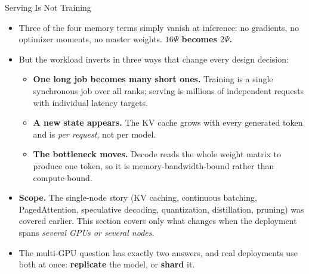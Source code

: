 \begin{frame}{Serving Is Not Training}
  \begin{itemize}\itemsep0.35em
    \item[\textcolor{red}{$\blacktriangleright$}] Three of the four memory terms simply vanish at inference: no gradients, no optimizer moments, no master weights. \textbf{$16\Psi$ becomes $2\Psi$.}
    \item[\textcolor{red}{$\blacktriangleright$}] But the workload inverts in three ways that change every design decision:
      \begin{itemize}\itemsep0.2em\footnotesize
        \item \textbf{One long job becomes many short ones.} Training is a single synchronous job over all ranks; serving is millions of independent requests with individual latency targets.
        \item \textbf{A new state appears.} The KV cache grows with every generated token and is \emph{per request}, not per model.
        \item \textbf{The bottleneck moves.} Decode reads the whole weight matrix to produce one token, so it is memory-bandwidth-bound rather than compute-bound.
      \end{itemize}
    \item[\textcolor{red}{$\blacktriangleright$}] \textbf{Scope.} The single-node story (KV caching, continuous batching, PagedAttention, speculative decoding, quantization, distillation, pruning) was covered earlier. This section covers only what changes when the deployment spans \emph{several GPUs or several nodes}.
    \item[\textcolor{red}{$\blacktriangleright$}] The multi-GPU question has exactly two answers, and real deployments use both at once: \textbf{replicate} the model, or \textbf{shard} it.
  \end{itemize}
\end{frame}


